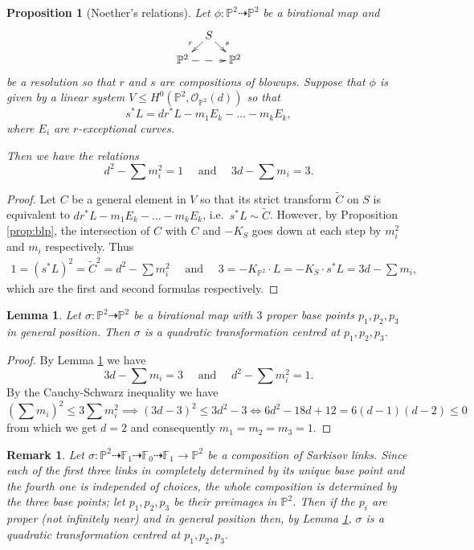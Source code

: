 \documentclass[a4paper,11pt]{amsart}
\newtheorem{lemma}[theorem]{Lemma}
\newtheorem{proposition}[theorem]{Proposition}
\newtheorem{remark}[theorem]{Remark}
\newcommand{\OO}{\mathcal{O}}
\newcommand{\PP}{\mathbb{P}}
\renewcommand{\FF}{\mathbb{F}}
\newcommand{\rmap}{\dashrightarrow}
\begin{document}
\begin{proposition}[Noether's relations]\label{prop:NoetherRel}
	Let $\phi\colon\PP^2 \rmap \PP^2$ be a birational map and 
	\[
	\xymatrix@R=.3cm@C=.3cm{
	& S \ar[ld]_r \ar[rd]^s \\
	\PP^2 \ar@{-->}[rr] && \PP^2
	}
	\]
	be a resolution so that $r$ and $s$ are compositions of blowups.
	Suppose that $\phi$ is given by a linear system $V \leq H^0(\PP^2,\OO_{\PP^2}(d))$ so that
	\[
	s^*L = dr^*L - m_1E_k - \ldots - m_kE_k,
	\]
	where $E_i$ are $r$-exceptional curves.
	
	Then we have the relations
	\[
	d^2 - \sum m_i^2 = 1 \quad \text{ and } \quad 3d - \sum m_i = 3.
	\]
\end{proposition}

\begin{proof}
	Let $C$ be a general element in $V$ so that its strict transform $\tilde{C}$ on $S$ is equivalent to $dr^*L - m_1E_k - \ldots - m_kE_k$, i.e.\ $s^*L \sim \tilde{C}$.
	However, by Proposition \ref{prop:blp}, the intersection of $C$ with $C$ and $-K_{S}$ goes down at each step by $m_i^2$ and $m_i$ respectively.
	Thus 
	\begin{gather*}
	1 = (s^*L)^2 = \tilde{C}^2 = d^2 - \sum m_i^2 \quad \text{ and } \quad
	3 = -K_{\PP^2}\cdot L = -K_S\cdot s^*L = 3d - \sum m_i,
	\end{gather*}
	which are the first and second formulas respectively.	
\end{proof}

\begin{lemma}\label{lem:genera3blocks=stdQuad}
	Let $\sigma\colon \PP^2 \rmap \PP^2$ be a birational map with $3$ proper base points $p_1,p_2,p_3$ in general position.
	Then $\sigma$ is a quadratic transformation centred at $p_1,p_2,p_3$.
\end{lemma}

\begin{proof}
	By Lemma \ref{prop:NoetherRel} we have
	\[
	3d - \sum m_i = 3 \quad \text{ and } \quad d^2 - \sum m_i^2 = 1.
	\]
	By the Cauchy-Schwarz inequality we have
	\[
	\left(\sum m_i\right)^2 \leq 3 \sum m_i^2 \implies (3d-3)^2 \leq 3d^2 -3 \iff 6d^2 - 18d + 12 = 6(d-1)(d-2) \leq 0
	\]
	from which we get $d = 2$ and consequently $m_1 = m_2 = m_3 = 1$.
\end{proof}


\begin{remark}\label{rem:21012}
	Let $\sigma\colon \PP^2 \rmap \FF_1 \rmap \FF_0 \rmap \FF_1 \longrightarrow \PP^2$ be a composition of Sarkisov links.
	Since each of the first three links in completely determined by its unique base point and the fourth one is independed of choices, the whole composition is determined by the three base points;
	let $p_1, p_2, p_3$ be their preimages in $\PP^2$.
	Then if the $p_i$ are proper (not infinitely near) and in general position then, by Lemma \ref{lem:genera3blocks=stdQuad}, $\sigma$ is a quadratic transformation centred at $p_1,p_2,p_3$.
\end{remark}
\end{document}
